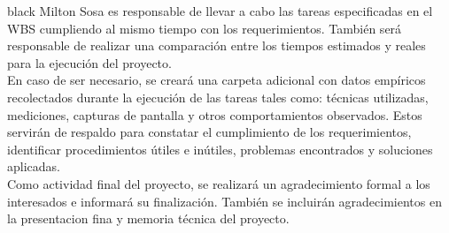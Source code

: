 \documentclass[11pt]{charter}
\begin{document}
\begin{consigna}{black}
Milton Sosa es responsable de llevar a cabo las tareas especificadas en el WBS cumpliendo al mismo tiempo con los requerimientos. También será responsable de realizar una comparación entre los tiempos estimados y reales para la ejecución del proyecto.\\

En caso de ser necesario, se creará una carpeta adicional con datos empíricos recolectados durante la ejecución de las tareas tales como: técnicas utilizadas, mediciones, capturas de pantalla y otros comportamientos observados. Estos servirán de respaldo para constatar el cumplimiento de los requerimientos, identificar procedimientos útiles e inútiles, problemas encontrados y soluciones aplicadas.\\

Como actividad final del proyecto, se realizará un agradecimiento formal a los interesados e informará su finalización. También se incluirán agradecimientos en la presentacion fina y memoria técnica del proyecto.


\end{consigna}
\end{document}
